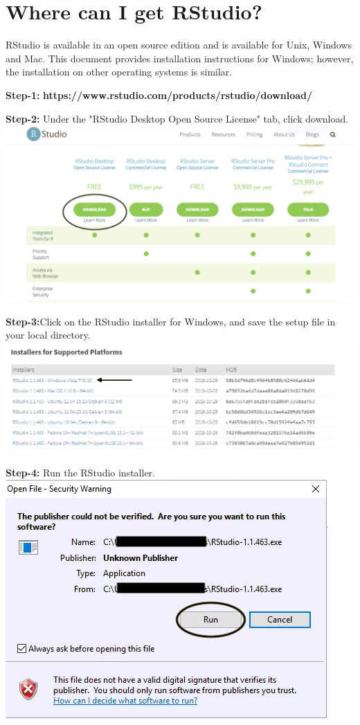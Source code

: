 \documentclass[a4paper]{report}
\begin{document}
    \section{Where can I get RStudio?}
       \begin{flushleft}
            RStudio is available in an open source edition and is available for Unix, Windows and Mac. This document provides installation instructions for Windows; however, the installation on other operating systems is similar. 
            
          \textbf{Step-1:} \textbf{https://www.rstudio.com/products/rstudio/download/}
          
          \textbf{Step-2:} Under the "RStudio Desktop Open Source License" tab, click download. 
          \includegraphics[width=\textwidth]{images/download1.png}
          
         \textbf{Step-3:}Click on the RStudio installer for Windows, and save the setup file in your local directory. \includegraphics[width=\textwidth]{images/download2.png}
         
         \newpage
         
        \textbf{Step-4:} Run the RStudio installer. \includegraphics[width=\textwidth]{images/download3.png}


\end{flushleft}
\end{document}
